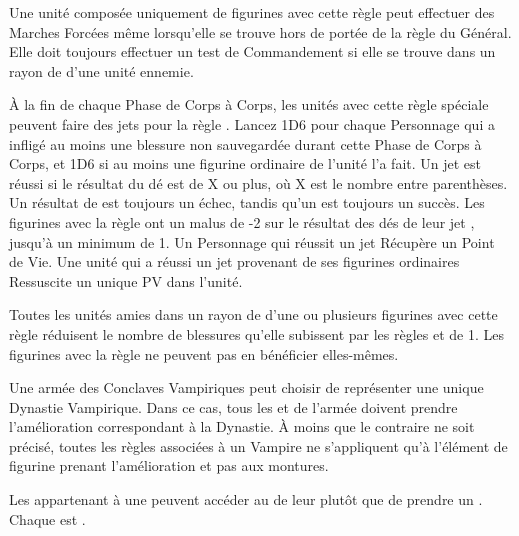 
Une unité composée uniquement de figurines avec cette règle peut effectuer des Marches Forcées même lorsqu'elle se trouve hors de portée de la règle \inspiringpresence{} du Général. Elle doit toujours effectuer un test de Commandement si elle se trouve dans un rayon de  d'une unité ennemie.

À la fin de chaque Phase de Corps à Corps, les unités avec cette règle spéciale peuvent faire des jets pour la règle \vampiric{}. Lancez 1D6 pour chaque Personnage \vampiric{} qui a infligé au moins une blessure non sauvegardée durant cette Phase de Corps à Corps, et 1D6 si au moins une figurine ordinaire \vampiric{} de l'unité l'a fait. Un jet \vampiric{} est réussi si le résultat du dé est de X ou plus, où X est le nombre entre parenthèses. Un résultat de  est toujours un échec, tandis qu'un  est toujours un succès. Les figurines avec la règle \largetarget{} ont un malus de -2 sur le résultat des dés de leur jet \vampiric{}, jusqu'à un minimum de 1. Un Personnage qui réussit un jet \vampiric{} Récupère un Point de Vie. Une unité qui a réussi un jet \vampiric{} provenant de ses figurines ordinaires Ressuscite un unique PV dans l'unité.

\armyspecialruleentry{\necromanticaura}

Toutes les unités amies dans un rayon de  d'une ou plusieurs figurines avec cette règle réduisent le nombre de blessures qu'elle subissent par les règles \ashestoashes{} et \unstable{} de 1. Les figurines avec la règle \necromanticaura{} ne peuvent pas en bénéficier elles-mêmes.


\closearmyspecialrules



\spaceaftersection{}

Une armée des Conclaves Vampiriques peut choisir de représenter une unique Dynastie Vampirique. Dans ce cas, tous les \vampirelords{} et \vampireheroes{} de l'armée doivent prendre l'amélioration correspondant à la Dynastie. À moins que le contraire ne soit précisé, toutes les règles associées à un Vampire ne s'appliquent qu'à l'élément de figurine prenant l'amélioration et pas aux montures.


Les \vampirelords{} appartenant à une \bloodline{} peuvent accéder au \ancientbloodpower{} de leur \bloodline{} plutôt que de prendre un \bloodpower{}. Chaque \ancientbloodpower{} est \oneofakind{}.


